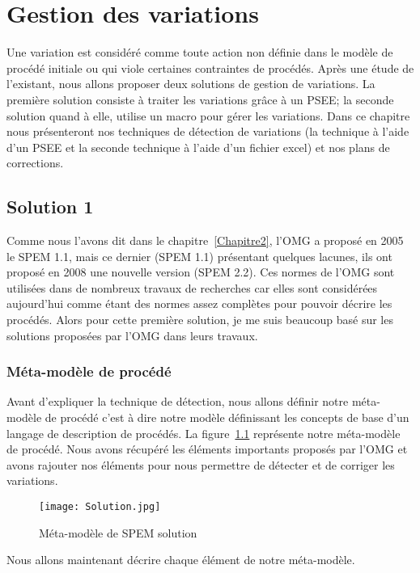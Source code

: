 \chapter{Gestion des variations} %
\label{Chapitre3} %
Une variation est considéré comme toute action non définie dans le modèle de procédé initiale ou qui viole certaines contraintes de procédés.
Après une étude de l'existant, nous allons proposer deux solutions de gestion de variations. La première solution consiste à traiter les variations grâce à un PSEE; la seconde solution quand à elle, utilise un macro pour gérer les variations.
Dans ce chapitre nous présenteront nos techniques de détection de variations (la technique à l'aide d'un PSEE et la seconde technique à l'aide d'un fichier excel) et nos plans de corrections.
\section{Solution 1}
Comme nous l'avons dit dans le chapitre~\ref{Chapitre2}, l'OMG a proposé en 2005 le SPEM 1.1, mais ce dernier (SPEM 1.1) présentant quelques lacunes, ils ont proposé en 2008 une nouvelle version (SPEM 2.2). 
Ces normes de l'OMG sont utilisées dans de nombreux travaux de recherches car elles sont considérées aujourd'hui comme étant des normes assez complètes pour pouvoir décrire les procédés. Alors pour cette première solution, je me suis beaucoup basé sur les solutions proposées par l'OMG dans leurs travaux.
\subsection{Méta-modèle de procédé}
Avant d'expliquer la technique de détection, nous allons définir notre méta-modèle de procédé c'est à dire notre modèle définissant les concepts de base d'un langage de description de procédés.
La figure~\ref{metamodele} représente notre méta-modèle de procédé. Nous avons récupéré les éléments importants proposés par l'OMG et avons rajouter nos éléments pour nous permettre de détecter et de corriger les variations.
\begin{figure}[h]
\centering
\texttt{[image: Solution.jpg]}
\caption{\label{metamodele}Méta-modèle de SPEM solution}
\end{figure}
Nous allons maintenant décrire chaque élément de notre méta-modèle.
